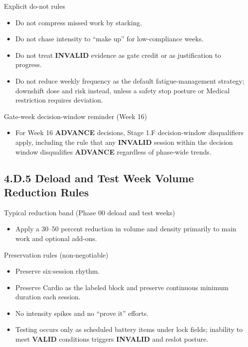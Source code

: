 \documentclass[10pt]{article}
\begin{document}
Explicit do-not rules

\begin{itemize}
\item Do not compress missed work by stacking.
\item Do not chase intensity to “make up” for low-compliance weeks.
\item Do not treat \textbf{INVALID} evidence as gate credit or as justification to progress.
\item Do not reduce weekly frequency as the default fatigue-management strategy; downshift dose and risk instead, unless a safety stop posture or Medical restriction requires deviation.
\end{itemize}

Gate-week decision-window reminder (Week 16)

\begin{itemize}
\item For Week 16 \textbf{ADVANCE} decisions, Stage 1.F decision-window disqualifiers apply, including the rule that any \textbf{INVALID} session within the decision window disqualifies \textbf{ADVANCE} regardless of phase-wide trends.
\end{itemize}

\subsection*{4.D.5 Deload and Test Week Volume Reduction Rules}
{}

Typical reduction band (Phase 00 deload and test weeks)

\begin{itemize}
\item Apply a 30–50 percent reduction in volume and density primarily to main work and optional add-ons.
\end{itemize}

Preservation rules (non-negotiable)

\begin{itemize}
\item Preserve six-session rhythm.
\item Preserve Cardio as the labeled block and preserve continuous minimum duration each session.
\item No intensity spikes and no “prove it” efforts.
\item Testing occurs only as scheduled battery items under lock fields; inability to meet \textbf{VALID} conditions triggers \textbf{INVALID} and reslot posture.
\end{itemize}
\end{document}
